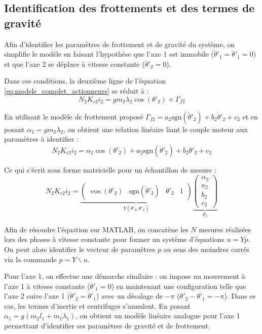 \documentclass[10pt,a4paper,twocolumn]{article}
\begin{document}
\subsection{Identification des frottements et des termes de gravité}
Afin d'identifier les paramètres de frottement et de gravité du système, on simplifie le 
modèle en faisant l'hypothèse que l'axe 1 est immobile ($\dot{\theta}'_1 = \ddot{\theta}'_1 = 0$) 
et que l'axe 2 se déplace à vitesse constante ($\ddot{\theta}'_2 = 0$).

Dans ces conditions, la deuxième ligne de l'équation \eqref{eq:modele_complet_actionneurs} se 
réduit à :
\begin{equation}
  N_2 K_{c2} i_2 = g m_2 \lambda_2 \cos(\theta'_2) + \Gamma_{f2}
\label{eq:equilibre_axe2}
\end{equation}

En utilisant le modèle de frottement proposé $\Gamma_{f2} = a_2 \text{sgn}(\dot{\theta}'_2) + b_2 \dot{\theta}'_2 + c_2$ et en posant $\alpha_2 = g m_2 \lambda_2$, on obtient une relation linéaire liant le couple moteur aux paramètres à identifier :
\begin{equation}
  N_2 K_{c2} i_2 = \alpha_2 \cos(\theta'_2) + a_2 \text{sgn}(\dot{\theta}'_2) + b_2 \dot{\theta}'_2 + c_2
\label{eq:modele_lineaire_axe2}
\end{equation}

Ce qui s'écrit sous forme matricielle pour un échantillon de mesure :
\begin{equation}
  N_2 K_{c2} i_2 = 
  \underbrace{\begin{pmatrix}
    \cos(\theta'_2) & \text{sgn}(\dot{\theta}'_2) & \dot{\theta}'_2 & 1
  \end{pmatrix}}_{Y(\theta'_2, \dot{\theta}'_2)}
  \underbrace{\begin{pmatrix}
    \alpha_2 \\ a_2 \\ b_2 \\ c_2
  \end{pmatrix}}_{p_2}
\end{equation}

Afin de résoudre l'équation sur MATLAB, on concatène les $N$ mesures réalisées lors des 
phases à vitesse constante pour former un système d'équations $u = Y p$. On peut alors 
identifier le vecteur de paramètres $p$ au sens des moindres carrés via 
la commande $p = Y \backslash u$.

Pour l'axe 1, on effectue une démarche similaire : on impose un mouvement à l'axe 1 à 
vitesse constante ($\ddot{\theta}'_1 = 0$) en maintenant une configuration telle que 
l'axe 2 suive l'axe 1 ($\dot{\theta}'_2 = \dot{\theta}'_1$) avec un décalage 
de $-\pi$ ($\theta'_2 - \theta'_1 = -\pi$). Dans ce cas, les termes d'inertie et 
centrifuges s'annulent. En posant $\alpha_1 = g(m_2 l_1 + m_1 \lambda_1)$, on obtient 
un modèle linéaire analogue pour l'axe 1 permettant d'identifier ses paramètres 
de gravité et de frottement.
\end{document}
